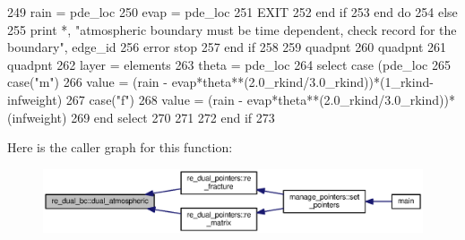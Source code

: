 \begin{DoxyCode}
249               rain = pde\_loc%
250               evap = pde\_loc%
251               \textcolor{keywordflow}{EXIT}
252 \textcolor{keywordflow}{            end if}
253 \textcolor{keywordflow}{          end do}
254         \textcolor{keywordflow}{else}
255           print *, \textcolor{stringliteral}{"atmospheric boundary must be time dependent, check record for the boundary"}\textcolor{comment}{, edge\_id}
256 \textcolor{comment}{          error stop}
257 \textcolor{comment}{}\textcolor{keywordflow}{        end if}
258 
259         quadpnt%
260         quadpnt%
261         quadpnt%
262         layer = elements%
263         theta =  pde\_loc%
264         \textcolor{keywordflow}{select case} (pde\_loc%
265           \textcolor{keywordflow}{case}(\textcolor{stringliteral}{"m"})
266             \textcolor{keywordtype}{value} = (rain - evap*theta**(2.0\_rkind/3.0\_rkind))*(1\_rkind-
      infweight\textcolor{comment}{)  }
267 \textcolor{comment}{          }\textcolor{keywordflow}{case}(\textcolor{stringliteral}{"f"})
268             \textcolor{keywordtype}{value} = (rain - evap*theta**(2.0\_rkind/3.0\_rkind))*(infweight\textcolor{comment}{)}
269 \textcolor{comment}{}\textcolor{keywordflow}{        end select}
270 
271 
272 \textcolor{keywordflow}{      end if}
273       
\end{DoxyCode}


Here is the caller graph for this function\+:\nopagebreak
\begin{figure}[H]
\begin{center}
\leavevmode
\includegraphics[width=350pt]{namespacere__dual__bc_a3c7fa40f15c5d89f1d6441664f1c71b4_icgraph}
\end{center}
\end{figure}


